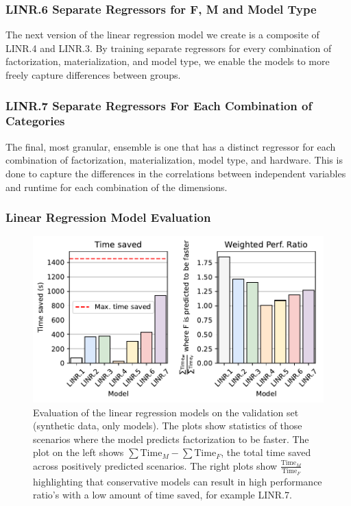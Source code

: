 \subsubsection*{LINR.6 Separate Regressors for F, M and Model Type}
The next version of the linear regression model we create is a composite of LINR.4 and LINR.3. By training separate regressors for every combination of factorization, materialization, and model type, we enable the models to more freely capture differences between groups.

\subsubsection*{LINR.7 Separate Regressors For Each Combination of Categories}
The final, most granular, ensemble is one that has a distinct regressor for each combination of factorization, materialization, model type, and hardware. This is done to capture the differences in the correlations between independent variables and runtime for each combination of the dimensions.


\subsubsection{Linear Regression Model Evaluation}
\begin{figure}[ht]
    \centering
    \includegraphics[width=0.75\linewidth]{chapters/05_cost_estimation/figures/stat-models-compare.pdf}
    \caption[Linear Regression Model Evaluation]{Evaluation of the linear regression models on the validation set (synthetic data, only models). The plots show statistics of those scenarios where the model predicts factorization to be faster. The plot on the left shows $\sum \text{Time}_M - \sum \text{Time}_F$, the total time saved across positively predicted scenarios. The right plots show $\frac{\text{Time}_M}{\text{Time}_F}$ highlighting that conservative models can result in high performance ratio's with a low amount of time saved, for example LINR.7.}
    \label{fig:5-linear-regression-model-evaluation}
\end{figure}

